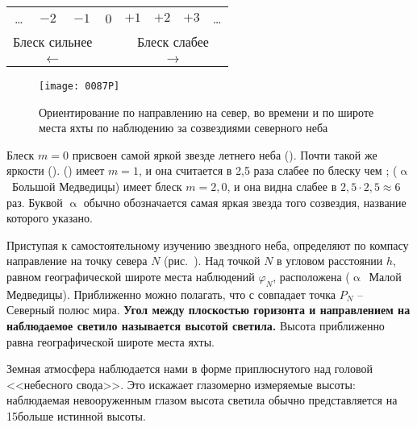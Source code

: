 \begin{center}
  \small
  \begin{tabular}[c]{cccccccc}
    \ldots & $-2$ & $-1$ & 0 & $+1$ & $+2$ & $+3$ & \ldots \\
    \multicolumn{3}{c}{Блеск сильнее} & & \multicolumn{4}{c}{Блеск слабее} \\
    \multicolumn{3}{c}{$\longleftarrow$} & & \multicolumn{4}{c}{$\longrightarrow$} 
  \end{tabular}
\end{center}

\begin{figure*}[!htb]
  \centering{}
  \texttt{[image: 0087P]}
  \caption{Ориентирование по направлению на север, во времени и по
    широте места яхты по наблюдению за созвездиями северного неба}
  \label{fig:87}
\end{figure*}

Блеск $m=0$ присвоен самой яркой звезде летнего неба 
(). Почти такой же яркости 
().  () имеет
$m = 1$, и она считается в 2,5 раза слабее по блеску чем
;  ($\upalpha$~Большой Медведицы) имеет
блеск $m = 2,0$, и она видна слабее  в
$2,5 \cdot 2,5 \approx 6$ раз. Буквой $\upalpha$ обычно обозначается
самая яркая звезда того созвездия, название которого указано.

Приступая к самостоятельному изучению звездного неба, определяют по
компасу направление на точку севера $N$ (рис.~). Над точкой
$N$ в угловом расстоянии $h$, равном географической широте места
наблюдений $\varphi_N$, расположена 
($\upalpha$~Малой Медведицы). Приближенно можно полагать, что с
 совпадает точка $P_N$ \--- Северный полюс
мира. \textbf{Угол между плоскостью горизонта и направлением на наблюдаемое
светило называется высотой светила.} Высота
 приближенно равна географической широте места
яхты.

Земная атмосфера наблюдается нами в форме приплюснутого над головой
<<небесного свода>>. Это искажает глазомерно измеряемые высоты:
наблюдаемая невооруженным глазом высота светила обычно представляется
на 15\gr больше истинной высоты.

